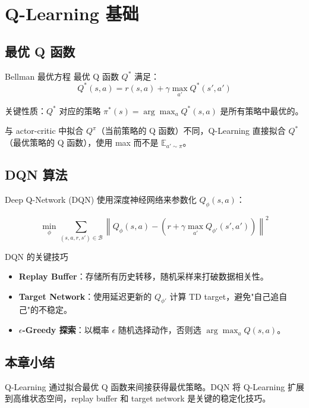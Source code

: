 \section{Q-Learning 基础}

\subsection{最优 Q 函数}

\begin{importantbox}{Bellman 最优方程}
最优 Q 函数 $Q^*$ 满足：
$$Q^*(s, a) = r(s, a) + \gamma \max_{a'} Q^*(s', a')$$

关键性质：$Q^*$ 对应的策略 $\pi^*(s) = \arg\max_a Q^*(s, a)$ 是所有策略中最优的。
\end{importantbox}

与 actor-critic 中拟合 $Q^\pi$（当前策略的 Q 函数）不同，Q-Learning 直接拟合 $Q^*$（最优策略的 Q 函数），使用 max 而不是 $\mathbb{E}_{a' \sim \pi}$。

\subsection{DQN 算法}

Deep Q-Network (DQN) 使用深度神经网络来参数化 $Q_\phi(s, a)$：

$$\min_\phi \sum_{(s,a,r,s') \in \mathcal{B}} \left\| Q_\phi(s, a) - \left(r + \gamma \max_{a'} Q_{\phi'}(s', a')\right) \right\|^2$$

\begin{importantbox}{DQN 的关键技巧}
\begin{itemize}
    \item \textbf{Replay Buffer}：存储所有历史转移，随机采样来打破数据相关性。
    \item \textbf{Target Network}：使用延迟更新的 $Q_{\phi'}$ 计算 TD target，避免"自己追自己"的不稳定。
    \item \textbf{$\epsilon$-Greedy 探索}：以概率 $\epsilon$ 随机选择动作，否则选 $\arg\max_a Q(s,a)$。
\end{itemize}
\end{importantbox}

\subsection{本章小结}
 
Q-Learning 通过拟合最优 Q 函数来间接获得最优策略。DQN 将 Q-Learning 扩展到高维状态空间，replay buffer 和 target network 是关键的稳定化技巧。

